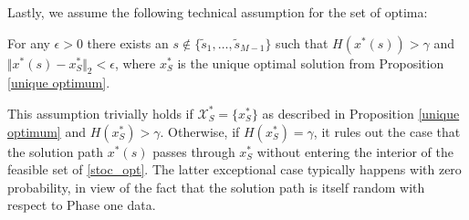 \documentclass[mnsc,blindrev]{informs4} %
\newcommand{\abs}[1]{\left \vert #1 \right\vert}
\begin{document}
Lastly, we assume the following technical assumption for the set of optima:
\begin{assumption}\label{unique optimal solution}
For any $\epsilon>0$ there exists an $s\notin\{\tilde s_1,\ldots,\tilde s_{M-1}\}$ such that $H(x^*(s))>\gamma$ and $\Vert x^*(s)-x_S^*\Vert_2<\epsilon$, where $x_S^*$ is the unique optimal solution from Proposition \ref{unique optimum}.
\end{assumption}
This assumption trivially holds if $\mathcal X_S^*=\{x_S^*\}$ as described in Proposition \ref{unique optimum} and $H(x_S^*)>\gamma$. Otherwise, if $H(x_S^*)=\gamma$, it rules out the case that the solution path $x^*(s)$ passes through $x_S^*$ without entering the interior of the feasible set of \eqref{stoc_opt}. The latter exceptional case typically happens with zero probability, in view of the fact that the solution path is itself random with respect to Phase one data.


\end{document}

